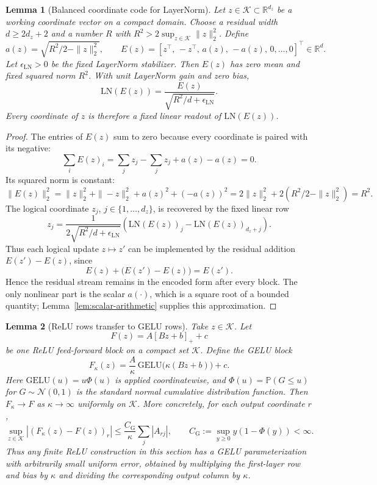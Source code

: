 \documentclass[11pt]{article}
\newtheorem{lemma}{Lemma}
\begin{document}
\begin{lemma}[Balanced coordinate code for LayerNorm]
\label{lem:layernorm-code}
Let \(z\in\mathcal{K}\subset\mathbb{R}^{d_z}\) be a working coordinate vector on a compact domain. Choose a residual width \(d\ge 2d_z+2\) and a number \(R\) with \(R^2>2\sup_{z\in\mathcal{K}}\|z\|_2^2\). Define
\[
a(z)=\sqrt{R^2/2-\|z\|_2^2},
\qquad
E(z)=[z^\top,\,-z^\top,\,a(z),\,-a(z),\,0,\ldots,0]^\top\in\mathbb{R}^d .
\]
Let \(\epsilon_{\mathrm{LN}}>0\) be the fixed LayerNorm stabilizer. Then \(E(z)\) has zero mean and fixed squared norm \(R^2\). With unit LayerNorm gain and zero bias,
\[
\mathrm{LN}(E(z))=
\frac{E(z)}{\sqrt{R^2/d+\epsilon_{\mathrm{LN}}}} .
\]
Every coordinate of \(z\) is therefore a fixed linear readout of \(\mathrm{LN}(E(z))\). 
\end{lemma}

\begin{proof}
The entries of \(E(z)\) sum to zero because every coordinate is paired with its negative:
\[
\sum_i E(z)_i=\sum_j z_j-\sum_j z_j+a(z)-a(z)=0 .
\]
Its squared norm is constant:
\[
\|E(z)\|_2^2
=\|z\|_2^2+\|-z\|_2^2+a(z)^2+(-a(z))^2
=2\|z\|_2^2+2(R^2/2-\|z\|_2^2)
=R^2 .
\]
The logical coordinate \(z_j\), \(j\in\{1,\ldots,d_z\}\), is recovered by the fixed linear row
\[
z_j=\frac{1}{2\sqrt{R^2/d+\epsilon_{\mathrm{LN}}}}
\left(\mathrm{LN}(E(z))_j-\mathrm{LN}(E(z))_{d_z+j}\right).
\]
Thus each logical update \(z\mapsto z'\) can be implemented by the residual
addition \(E(z')-E(z)\), since
\[
E(z)+\bigl(E(z')-E(z)\bigr)=E(z').
\]
Hence the residual stream remains in the encoded form after every block. The only nonlinear part is the scalar \(a(\cdot)\), which is a square root of a bounded quantity; Lemma~\ref{lem:scalar-arithmetic} supplies this approximation.
\end{proof}

\begin{lemma}[ReLU rows transfer to GELU rows]
\label{lem:relu-gelu-transfer}
Take $z \in \mathcal{K}$. Let
\[
F(z)=A[Bz+b]_+ + c
\]
be one ReLU feed-forward block on a compact set \(\mathcal{K}\). Define the GELU block
\[
F_\kappa(z)=\frac{A}{\kappa}\,\mathrm{GELU}\!\bigl(\kappa(Bz+b)\bigr)+c .
\]
Here \(\mathrm{GELU}(u)=u\Phi(u)\) is applied coordinatewise, and
\(\Phi(u)=\mathbb{P}(G\le u)\) for \(G\sim\mathcal{N}(0,1)\) is the standard normal cumulative distribution function.
Then \(F_\kappa\to F\) as $\kappa \to \infty$ uniformly on \(\mathcal{K}\). More concretely, for each output coordinate \(r\),
\[
\sup_{z\in\mathcal{K}} |(F_\kappa(z)-F(z))_r|
\le
\frac{C_{\mathrm{G}}}{\kappa}\sum_j |A_{rj}|,
\qquad
C_{\mathrm{G}}:=\sup_{y\ge0} y(1-\Phi(y))<\infty .
\]
Thus any finite ReLU construction in this section has a GELU parameterization with arbitrarily small uniform error, obtained by multiplying the first-layer row and bias by \(\kappa\) and dividing the corresponding output column by \(\kappa\).
\end{lemma}
\end{document}
